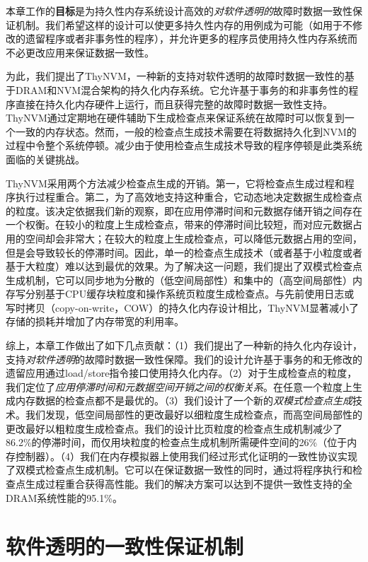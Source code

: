 本章工作的\textbf{目标}是为持久性内存系统设计高效的\emph{对软件透明的}故障时数据一致性保证机制。我们希望这样的设计可以使更多持久性内存的用例成为可能（如用于不修改的遗留程序或者非事务性的程序），并允许更多的程序员使用持久性内存系统而不必更改应用来保证数据一致性。

为此，我们提出了ThyNVM，一种新的支持对软件透明的故障时数据一致性的基于DRAM和NVM混合架构的持久化内存系统。它允许基于事务的和非事务性的程序直接在持久化内存硬件上运行，而且获得完整的故障时数据一致性支持。ThyNVM通过定期地在硬件辅助下生成检查点来保证系统在故障时可以恢复到一个一致的内存状态。然而，一般的检查点生成技术需要在将数据持久化到NVM的过程中令整个系统停顿。减少由于使用检查点生成技术导致的程序停顿是此类系统面临的关键挑战。

ThyNVM采用两个方法减少检查点生成的开销。第一，它将检查点生成过程和程序执行过程重合。第二，为了高效地支持这种重合，它动态地决定数据生成检查点的粒度。该决定依据我们新的观察，即在应用停滞时间和元数据存储开销之间存在一个权衡。在较小的粒度上生成检查点，带来的停滞时间比较短，而对应元数据占用的空间却会非常大；在较大的粒度上生成检查点，可以降低元数据占用的空间，但是会导致较长的停滞时间。因此，单一的检查点生成技术（或者基于小粒度或者基于大粒度）难以达到最优的效果。为了解决这一问题，我们提出了双模式检查点生成机制，它可以同步地为分散的（低空间局部性）和集中的（高空间局部性）内存写分别基于CPU缓存块粒度和操作系统页粒度生成检查点。与先前使用日志\cite{Volos:2011:MLP:1950365.1950379, Coburn:2011:NMP:1950365.1950380}或写时拷贝（copy-on-write，COW）\cite{Condit:2009:BIT:1629575.1629589, Venkataraman:2011:CDD:1960475.1960480}的持久化内存设计相比，ThyNVM显著减小了存储的损耗并增加了内存带宽的利用率。

综上，本章工作做出了如下几点贡献：（1）我们提出了一种新的持久化内存设计，支持\emph{对软件透明}的故障时数据一致性保障。我们的设计允许基于事务的和无修改的遗留应用通过load/store指令接口使用持久化内存。（2）对于生成检查点的粒度，我们定位了\emph{应用停滞时间和元数据空间开销之间的权衡关系}。在任意一个粒度上生成内存数据的检查点都不是最优的。（3）我们设计了一个新的\emph{双模式检查点生成}技术。我们发现，低空间局部性的更改最好以细粒度生成检查点，而高空间局部性的更改最好以粗粒度生成检查点。我们的设计比页粒度的检查点生成机制减少了86.2\%的停滞时间，而仅用块粒度的检查点生成机制所需硬件空间的26\%（位于内存控制器）。（4）我们在内存模拟器上使用我们经过形式化证明的一致性协议实现了双模式检查点生成机制。它可以在保证数据一致性的同时，通过将程序执行和检查点生成过程重合获得高性能。我们的解决方案可以达到不提供一致性支持的全DRAM系统性能的95.1\%。

\section{软件透明的一致性保证机制}


